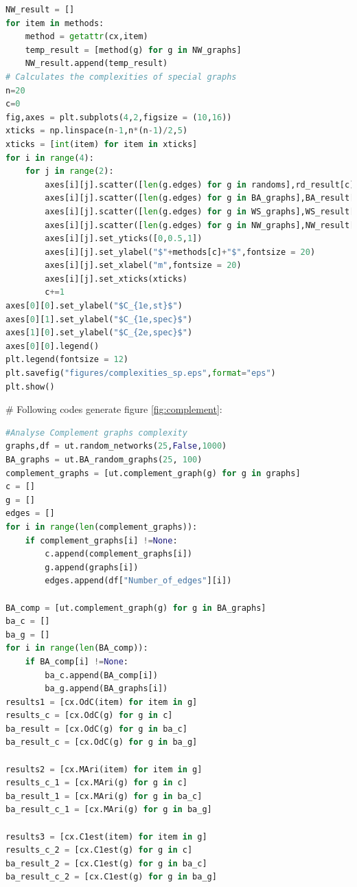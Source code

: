 \documentclass[12pt]{article}
\begin{document}
{\begin{lstlisting}[breaklines=true,language=Python]
NW_result = []
for item in methods:
    method = getattr(cx,item)
    temp_result = [method(g) for g in NW_graphs]
    NW_result.append(temp_result)
# Calculates the complexities of special graphs
n=20
c=0
fig,axes = plt.subplots(4,2,figsize = (10,16))
xticks = np.linspace(n-1,n*(n-1)/2,5)
xticks = [int(item) for item in xticks]
for i in range(4):
    for j in range(2):
        axes[i][j].scatter([len(g.edges) for g in randoms],rd_result[c],s=15,color = "black",alpha = 0.7,label = "$G(n,m)$")
        axes[i][j].scatter([len(g.edges) for g in BA_graphs],BA_result[c],s=15,color = "green",label = "BA")
        axes[i][j].scatter([len(g.edges) for g in WS_graphs],WS_result[c],marker = "x",s=15,color = "red",label = "WS")
        axes[i][j].scatter([len(g.edges) for g in NW_graphs],NW_result[c],marker = "s",s=15,color = "blue",label = "NW")
        axes[i][j].set_yticks([0,0.5,1])
        axes[i][j].set_ylabel("$"+methods[c]+"$",fontsize = 20)
        axes[i][j].set_xlabel("m",fontsize = 20)
        axes[i][j].set_xticks(xticks)
        c+=1
axes[0][0].set_ylabel("$C_{1e,st}$")
axes[0][1].set_ylabel("$C_{1e,spec}$")
axes[1][0].set_ylabel("$C_{2e,spec}$")
axes[0][0].legend()
plt.legend(fontsize = 12)
plt.savefig("figures/complexities_sp.eps",format="eps")
plt.show()
\end{lstlisting}
\noindent
\newline
\# Following codes generate figure \ref{fig:complement}:
\begin{lstlisting}[breaklines=true,language=Python]
#Analyse Complement graphs complexity
graphs,df = ut.random_networks(25,False,1000)
BA_graphs = ut.BA_random_graphs(25, 100)
complement_graphs = [ut.complement_graph(g) for g in graphs]
c = []
g = []
edges = []
for i in range(len(complement_graphs)):
    if complement_graphs[i] !=None:
        c.append(complement_graphs[i])
        g.append(graphs[i])
        edges.append(df["Number_of_edges"][i])
    
BA_comp = [ut.complement_graph(g) for g in BA_graphs]
ba_c = []
ba_g = []
for i in range(len(BA_comp)):
    if BA_comp[i] !=None:
        ba_c.append(BA_comp[i])
        ba_g.append(BA_graphs[i])
results1 = [cx.OdC(item) for item in g]
results_c = [cx.OdC(g) for g in c]
ba_result = [cx.OdC(g) for g in ba_c]
ba_result_c = [cx.OdC(g) for g in ba_g]

results2 = [cx.MAri(item) for item in g]
results_c_1 = [cx.MAri(g) for g in c]
ba_result_1 = [cx.MAri(g) for g in ba_c]
ba_result_c_1 = [cx.MAri(g) for g in ba_g]

results3 = [cx.C1est(item) for item in g]
results_c_2 = [cx.C1est(g) for g in c]
ba_result_2 = [cx.C1est(g) for g in ba_c]
ba_result_c_2 = [cx.C1est(g) for g in ba_g]


\end{lstlisting}}
\end{document}

